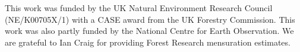 \documentclass[draft,linenumbers]{agujournal}
\begin{document}
%
%

%

%




%
%
%
%
%
%
%


\acknowledgments
This work was funded by the UK Natural Environment Research Council (NE/K00705X/1) with a CASE award from the UK Forestry Commission. This work was also partly funded by the National Centre for Earth Observation. We are grateful to Ian Craig for providing Forest Research mensuration estimates.


\end{document}

